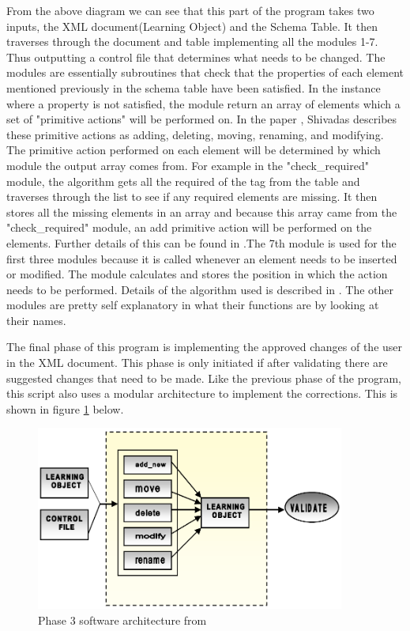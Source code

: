 \documentclass{report}
\begin{document}
From the above diagram we can see that this part of the program takes two inputs, the XML document(Learning Object) and the Schema Table. It then traverses through the document and table implementing all the modules 1-7. Thus outputting a control file that determines what needs to be changed.
The modules are essentially subroutines that check that the properties of each element mentioned previously in the schema table have been satisfied. In the instance where a property is not satisfied, the module return an array of elements which a set of "primitive actions" will be performed on. In the paper \cite{shivadas2001intelligent}, Shivadas describes these primitive actions as adding, deleting, moving, renaming, and modifying. The primitive action performed on each element will be determined by which module the output array comes from. For example in the "check{\_}required" module, the algorithm gets all the required of the tag from the table and traverses through the list to see if any required elements are missing. It then stores all the missing elements in an array and because this array came from the "check{\_}required" module, an add primitive action will be performed on the elements. Further details of this can be found in \cite{shivadas2001intelligent}.The 7th module is used for the first three modules because it is called whenever an element needs to be inserted or modified. The module calculates and stores the position in which the action needs to be performed. Details of the algorithm used is described in \cite{shivadas2001intelligent}. The other modules are pretty self explanatory in what their functions are by looking at their names.

The final phase of this program is implementing the approved changes of the user in the XML document. This phase is only initiated if after validating there are suggested changes that need to be made. Like the previous phase of the program, this script also uses a modular architecture to implement the corrections. This is shown in figure \ref{fig:phase3arch} below.

\begin{figure}[H]
\centering
\includegraphics[width=4in]{phase3arch.png}%
\caption{Phase 3 software architecture from \cite{shivadas2001intelligent}}%
\label{fig:phase3arch}%
\end{figure}
\end{document}

